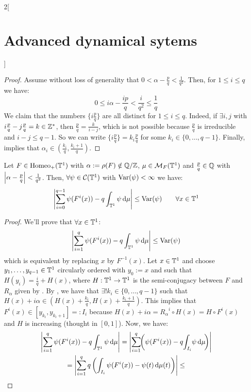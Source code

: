 \documentclass[../../../main_math.tex]{subfiles}
\begin{document}
\begin{multicols}{2}[\section{Advanced dynamical sytems}]
\begin{lemma}
  \end{lemma}
  \begin{proof}
    Assume without loss of generality that $0<\alpha-\frac{p}{q}<\frac{1}{q^2}$. Then, for $1\leq i\leq q$ we have:
    \begin{equation}\label{ADS:ineq_alpha_i}
      0\leq i\alpha -\frac{ip}{q}<\frac{i}{q^2}\leq \frac{1}{q}
    \end{equation}
    We claim that the numbers $\{i \frac{p}{q}\}$ are all distinct for $1\leq i\leq q$. Indeed, if $\exists i,j$ with $i\frac{p}{q} -j\frac{p}{q}=k\in\mathbb{Z}^*$, then $\frac{p}{q}=\frac{k}{i-j}$, which is not possible because $\frac{p}{q}$ is irreducible and $i-j \leq q-1$. So we can write $\{i \frac{p}{q}\}=k_i\frac{p}{q}$ for some $k_i\in\{0,\ldots,q-1\}$. Finally,  implies that $\alpha_i\in \left(\frac{k_i}{q},\frac{k_i+1}{q}\right)$.
  \end{proof}
  \begin{proposition}\label{ADS:denjoy_koksma}
    Let $F\in\mathrm{Homeo}_+(\mathbb{T}^1)$ with $\alpha:=\rho(F)\notin \quot{\QQ}{\ZZ}$, $\mu\in\mathcal{M}_F(\mathbb{T}^1)$ and $\frac{p}{q}\in \mathbb{Q}$ with $\abs{\alpha-\frac{p}{q}}<\frac{1}{q^2}$. Then, $\forall\psi\in \mathcal{C}(\mathbb{T}^1)$ with $\mathrm{Var}(\psi)<\infty$ we have:
    $$
      \abs{\sum_{i=0}^{q-1}\psi(F^i(x))-q\int_{\mathbb{T}^1}\psi\dd{\mu}}\leq\mathrm{Var}(\psi) \qquad \forall x\in \mathbb{T}^1
    $$
  \end{proposition}
  \begin{proof}
    We'll prove that $\forall x\in \mathbb{T}^1$:
    $$
      \abs{\sum_{i=1}^q \psi(F^i(x))-q\int_{\mathbb{T}^1}\psi\dd{\mu}}\leq \mathrm{Var}(\psi)
    $$
    which is equivalent by replacing $x$ by $F^{-1}(x)$.
    Let $x\in \mathbb{T}^1$ and choose $y_1,\ldots,y_{q-1}\in \mathbb{T}^1$ circularly ordered with $y_0:=x$ and such that $H(y_i)=\frac{i}{q}+H(x)$, where $H:\mathbb{T}^1\to \mathbb{T}^1$ is the semi-conjugacy between $F$ and $R_\alpha$ given by . By , we have that $\exists! k_i\in\{0,\ldots,q-1\}$ such that $H(x)+i\alpha\in\left( H(x)+ \frac{k_i}{q},H(x)+\frac{k_i+1}{q}\right)$. This implies that $F^i(x)\in [y_{k_i},y_{k_i+1}]=:I_i$ because $H(x) + i\alpha={R_\alpha}^i\circ H(x) = H\circ F^i(x)$ and $H$ is increasing (thought in $[0,1]$). Now, we have:
    \begin{multline*}
      \abs{\sum_{i=1}^q \psi(F^i(x))-q\int_{\TT^1}\psi\dd{\mu}}=\abs{\sum_{i=1}^q\!\! \left(\psi(F^i(x))-q\!\int_{I_i}\! \psi\dd{\mu}\!\right)}\\
      =\abs{\sum_{i=1}^q q\left(\int_{I_i}\psi(F^i(x))-\psi (t)\dd{\mu(t)}\right)}\leq\\

\end{multline*}
\end{proof}
\end{multicols}
\end{document}
